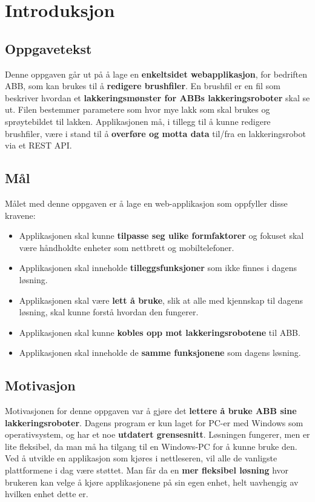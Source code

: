 \chapter{Introduksjon}
\label{introduksjon} %

\section{Oppgavetekst}
\label{oppgavetekst}
Denne oppgaven går ut på å lage en \textbf{enkeltsidet webapplikasjon}, for bedriften ABB, som kan brukes til å \textbf{redigere brushfiler}. En brushfil er en fil som beskriver hvordan et \textbf{lakkeringsmønster for ABBs lakkeringsroboter} skal se ut. Filen bestemmer parametere som hvor mye lakk som skal brukes og sprøytebildet til lakken. Applikasjonen må, i tillegg til å kunne redigere brushfiler, være i stand til å \textbf{overføre og motta data} til/fra en lakkeringsrobot via et REST API.

\section{Mål}
Målet med denne oppgaven er å lage en web-applikasjon som oppfyller disse kravene:
\begin{itemize}
\item Applikasjonen skal kunne \textbf{tilpasse seg ulike formfaktorer} og fokuset skal være håndholdte enheter som nettbrett og mobiltelefoner.
\item Applikasjonen skal inneholde \textbf {tilleggsfunksjoner} som ikke finnes i dagens løsning.
\item Applikasjonen skal være \textbf{lett å bruke}, slik at alle med kjennskap til dagens løsning, skal kunne forstå hvordan den fungerer.
\item Applikasjonen skal kunne \textbf{kobles opp mot lakkeringsrobotene} til ABB.
\item Applikasjonen skal inneholde de \textbf{samme funksjonene} som dagens løsning. 
\end{itemize}

\section{Motivasjon}
Motivasjonen for denne oppgaven var å gjøre det \textbf{lettere å bruke ABB sine lakkeringsroboter}. Dagens program er kun laget for PC-er med Windows som operativsystem, og har et noe \textbf{utdatert grensesnitt}. Løsningen fungerer, men er lite fleksibel, da man må ha tilgang til en Windows-PC for å kunne bruke den. Ved å utvikle en applikasjon som kjøres i nettleseren, vil alle de vanligste plattformene i dag være støttet. Man får da en \textbf{mer fleksibel løsning} hvor brukeren kan velge å kjøre applikasjonene på sin egen enhet, helt uavhengig av hvilken enhet dette er.
